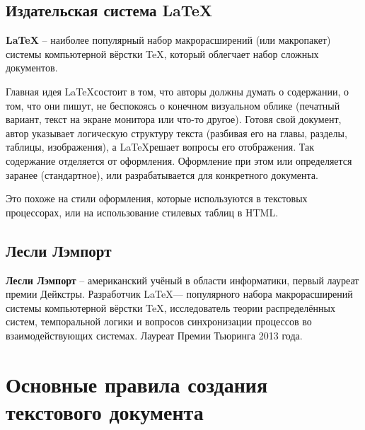 \documentclass[a4paper,12pt]{article}
\begin{document}
\subsection{Издательская система \LaTeX} 

\textbf{\LaTeX} -- наиболее популярный набор макрорасширений (или макропакет) системы компьютерной вёрстки \TeX, который облегчает набор сложных документов.

Главная идея \LaTeX состоит в том, что авторы должны думать о содержании, о том, что они пишут, не беспокоясь о конечном визуальном облике (печатный вариант, текст на экране монитора или что-то другое). Готовя свой документ, автор указывает логическую структуру текста (разбивая его на главы, разделы, таблицы, изображения), а \LaTeX решает вопросы его отображения. Так содержание отделяется от оформления. Оформление при этом или определяется заранее (стандартное), или разрабатывается для конкретного документа.

Это похоже на стили оформления, которые используются в текстовых процессорах, или на использование стилевых таблиц в HTML.

\subsection{Лесли Лэмпорт} 

\textbf{Лесли Лэмпорт} -- американский учёный в области информатики, первый лауреат премии Дейкстры. Разработчик \LaTeX — популярного набора макрорасширений системы компьютерной вёрстки \TeX, исследователь теории распределённых систем, темпоральной логики и вопросов синхронизации процессов во взаимодействующих системах. Лауреат Премии Тьюринга 2013 года.

\newpage
\section{Основные правила создания текстового документа}
\end{document}
